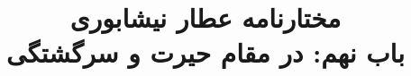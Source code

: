 \documentclass[14pt,b5paper]{article}
\begin{document}
\title{\Huge مختارنامه عطار نیشابوری \\
باب نهم: در مقام حیرت و سرگشتگی}
\author{ }
\date{ }
\maketitle
\newpage
\tableofcontents
\newpage

\newpage

\newpage

\newpage

\newpage

\newpage

\newpage

\newpage

\newpage

\newpage

\newpage

\newpage

\newpage

\newpage

\newpage

\newpage

\newpage

\newpage

\newpage

\newpage

\newpage

\newpage

\newpage

\newpage

\newpage

\newpage

\newpage

\newpage

\newpage

\newpage

\newpage

\newpage

\newpage

\newpage

\newpage

\newpage

\newpage

\newpage

\newpage

\newpage

\newpage

\newpage

\newpage

\newpage

\newpage

\newpage

\newpage

\newpage

\newpage
\end{document}
